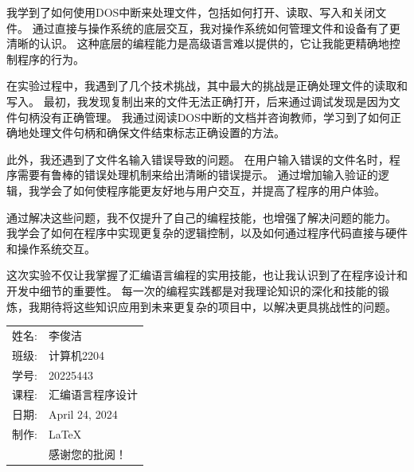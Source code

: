 \documentclass[12pt]{article}
\begin{document}
我学到了如何使用DOS中断来处理文件，包括如何打开、读取、写入和关闭文件。
通过直接与操作系统的底层交互，我对操作系统如何管理文件和设备有了更清晰的认识。
这种底层的编程能力是高级语言难以提供的，它让我能更精确地控制程序的行为。

在实验过程中，我遇到了几个技术挑战，其中最大的挑战是正确处理文件的读取和写入。
最初，我发现复制出来的文件无法正确打开，后来通过调试发现是因为文件句柄没有正确管理。
我通过阅读DOS中断的文档并咨询教师，学习到了如何正确地处理文件句柄和确保文件结束标志正确设置的方法。

此外，我还遇到了文件名输入错误导致的问题。
在用户输入错误的文件名时，程序需要有鲁棒的错误处理机制来给出清晰的错误提示。
通过增加输入验证的逻辑，我学会了如何使程序能更友好地与用户交互，并提高了程序的用户体验。

通过解决这些问题，我不仅提升了自己的编程技能，也增强了解决问题的能力。
我学会了如何在程序中实现更复杂的逻辑控制，以及如何通过程序代码直接与硬件和操作系统交互。

这次实验不仅让我掌握了汇编语言编程的实用技能，也让我认识到了在程序设计和开发中细节的重要性。
每一次的编程实践都是对我理论知识的深化和技能的锻炼，我期待将这些知识应用到未来更复杂的项目中，以解决更具挑战性的问题。

\begin{flushright}\begin{tabular}{rl}
    姓名: & 李俊洁\\
    班级: & 计算机2204 \\
    学号: & 20225443 \\
    课程: & 汇编语言程序设计 \\
    日期: & April 24, 2024 \\
    制作: & \LaTeX \\
    & 感谢您的批阅！
\end{tabular}\end{flushright}
\end{document}
